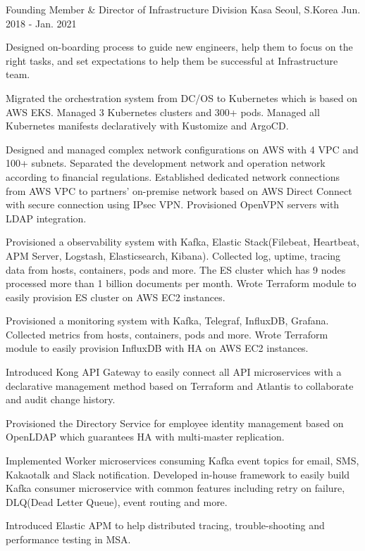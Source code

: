 \begin{cventries}
  \cventry
    {Founding Member \& Director of Infrastructure Division} %
    {Kasa} %
    {Seoul, S.Korea} %
    {Jun. 2018 - Jan. 2021} %
    {
      \begin{cvitems} %
        \item {Designed on-boarding process to guide new engineers, help them to focus on the right tasks, and set expectations to help them be successful at Infrastructure team.}
        \item {Migrated the orchestration system from DC/OS to Kubernetes which is based on AWS EKS. Managed 3 Kubernetes clusters and 300+ pods. Managed all Kubernetes manifests declaratively with Kustomize and ArgoCD.}
        \item {Designed and managed complex network configurations on AWS with 4 VPC and 100+ subnets. Separated the development network and operation network according to financial regulations. Established dedicated network connections from AWS VPC to partners' on-premise network based on AWS Direct Connect with secure connection using IPsec VPN. Provisioned OpenVPN servers with LDAP integration.}
        \item {Provisioned a observability system with Kafka, Elastic Stack(Filebeat, Heartbeat, APM Server, Logstash, Elasticsearch, Kibana). Collected log, uptime, tracing data from hosts, containers, pods and more. The ES cluster which has 9 nodes processed more than 1 billion documents per month. Wrote Terraform module to easily provision ES cluster on AWS EC2 instances.}
        \item {Provisioned a monitoring system with Kafka, Telegraf, InfluxDB, Grafana. Collected metrics from hosts, containers, pods and more. Wrote Terraform module to easily provision InfluxDB with HA on AWS EC2 instances.}
        \item {Introduced Kong API Gateway to easily connect all API microservices with a declarative management method based on Terraform and Atlantis to collaborate and audit change history.}
        \item {Provisioned the Directory Service for employee identity management based on OpenLDAP which guarantees HA with multi-master replication.}
        \item {Implemented Worker microservices consuming Kafka event topics for email, SMS, Kakaotalk and Slack notification. Developed in-house framework to easily build Kafka consumer microservice with common features including retry on failure, DLQ(Dead Letter Queue), event routing and more.}
        \item {Introduced Elastic APM to help distributed tracing, trouble-shooting and performance testing in MSA.}
      \end{cvitems}
    }


\end{cventries}
